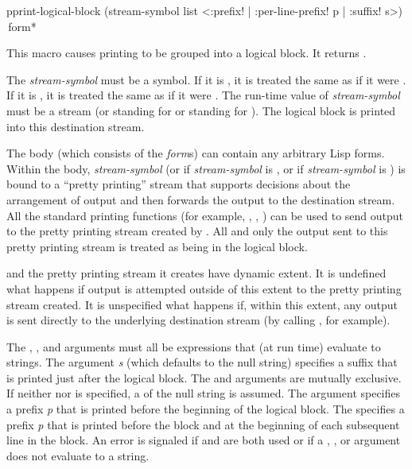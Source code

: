 \begin{defmac}
pprint-logical-block (stream-symbol list
                      <{\!:prefix! | \!:per-line-prefix!} p | \!:suffix! s>)  
                     {\,form}*

This macro causes printing to be grouped into a logical block.  It returns
.

The \emph{stream-symbol} must be a symbol.  If it is , it is treated the same
as if it were .  If it is , it is treated the same as if
it were .  The run-time value of \emph{stream-symbol} must
be a stream (or  standing for 
or  standing for ).
The logical block is printed into this destination stream.

The body (which consists of the \emph{form\/}s)
can contain any arbitrary Lisp forms.  Within the body,
\emph{stream-symbol} (or  if \emph{stream-symbol} is
, or  if \emph{stream-symbol} is ) is bound
to a ``pretty printing'' stream that supports decisions about the arrangement
of output and then forwards the output to the destination stream.  All the
standard printing functions (for example, , , ) can
be used to send output to the pretty printing stream created by
.  All and only the output sent to this pretty
printing stream is treated as being in the logical block.

 and the pretty printing stream it creates have dynamic
extent.  It is undefined what happens if output is attempted outside of
this extent to the pretty printing stream created.  It is unspecified what
happens if, within this extent, any output is sent directly to the
underlying destination stream (by calling , for example).

The , , and  arguments must all
be expressions that (at run time) evaluate to strings.  The  argument \emph{s}
(which defaults to the null string) specifies a suffix that is printed just
after the logical block.  The  and  arguments
are mutually exclusive.  If neither  nor  is 
specified, a  of the null string is assumed.
The  argument
specifies a prefix \emph{p} that is printed before the beginning of the logical block.
The  specifies a prefix \emph{p} that is printed before the block 
and at the beginning of each subsequent line in the block.
An error is signaled if  and  are both used
or if a , , or  argument does not
evaluate to a string.


\end{defmac}
